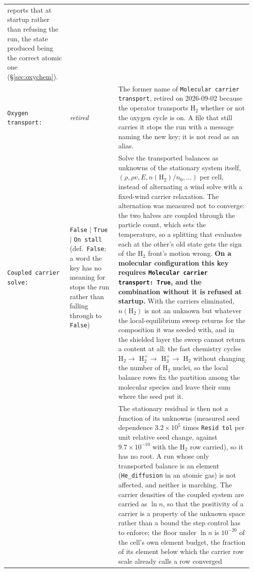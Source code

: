 \documentclass[english,a4paper]{my_memo}
\begin{document}
\begin{longtable}{@{}p{}p{}p{}@{}}
  reports that at startup rather than refusing the run, the state produced
  being the correct atomic one (\S\ref{sec:oxychem}). \\
\texttt{Oxygen transport:} & \emph{retired} & The former name of
  \texttt{Molecular carrier transport}, retired on 2026-09-02 because the
  operator transports H$_2$ whether or not the oxygen cycle is on. A file that
  still carries it stops the run with a message naming the new key; it is not
  read as an alias. \\
\texttt{Coupled carrier solve:} & \texttt{False} $|$ \texttt{True} $|$
  \texttt{On stall} (def.\ \texttt{False}; a word the key has no meaning for
  stops the run rather than falling through to \texttt{False}) & Solve the
  transported balances as unknowns of the
  stationary system itself, $(\rho, \rho v, E, n(\mathrm{H_2})/n_0, \ldots)$
  per cell, instead of alternating a wind solve with a fixed-wind carrier
  relaxation. The alternation was measured not to converge: the two halves
  are coupled through the particle count, which sets the temperature, so a
  splitting that evaluates each at the other's old state gets the sign of the
  H$_2$ front's motion wrong. \textbf{On a molecular configuration this key
  requires \texttt{Molecular carrier transport: True}, and the combination
  without it is refused at startup.} With the carriers eliminated,
  $n(\mathrm{H_2})$ is not an unknown but whatever the local-equilibrium
  sweep returns for the composition it was seeded with, and in the shielded
  layer the sweep cannot return a content at all: the fast chemistry cycles
  H$_2 \to$ H$_2^+ \to$ H$_3^+ \to$ H$_2$ without changing the number of
  H$_2$ nuclei, so the local balance rows fix the partition among the
  molecular species and leave their sum where the seed put it.
  \\
  & &  The stationary
  residual is then not a function of its unknowns (measured seed dependence
  $3.2\times10^5$ times \texttt{Resid tol} per unit relative seed change,
  against $9.7\times10^{-10}$ with the H$_2$ row carried), so it has no root.
  A run whose only transported balance is an element (\texttt{He\_diffusion}
  in an atomic gas) is not affected, and neither is marching. The carrier
  densities of the coupled system are carried as $\ln n$, so that the
  positivity of a carrier is a property of the unknown space rather than a
  bound the step control has to enforce; the floor under $\ln n$ is
  $10^{-20}$ of the cell's own element budget, the fraction of its element
  below which the carrier row scale already calls a row converged

\end{longtable}
\end{document}
